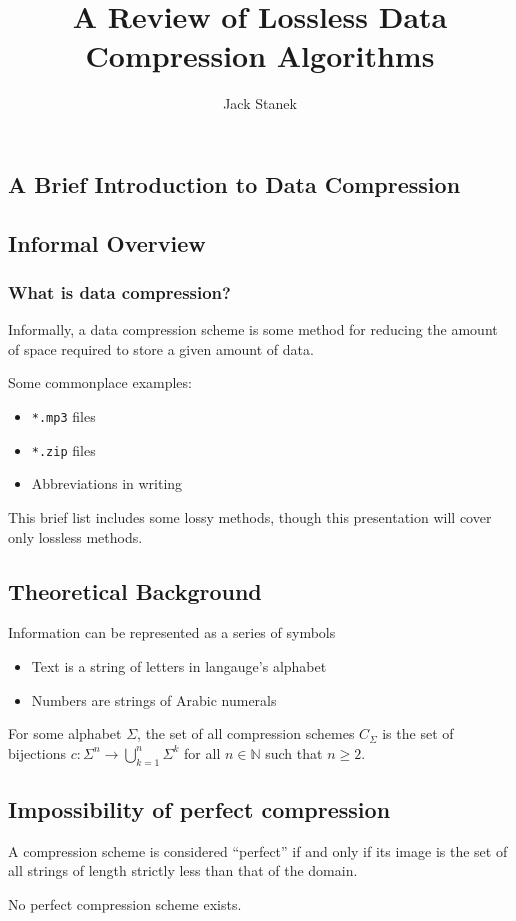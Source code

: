 \documentclass[mathserif,notheorems]{beamer} %
\title{A Review of Lossless Data Compression Algorithms}
\author{Jack Stanek}
\begin{document}
\begin{frame}
  \titlepage
\end{frame}

\begin{frame}
  \tableofcontents
\end{frame}

\begin{frame}
  \section{A Brief Introduction to Data Compression}
  \subsection{Informal Overview}
  \frametitle{What is data compression?}

  Informally, a data compression scheme is some method for reducing
  the amount of space required to store a given amount of data.

  Some commonplace examples:

  \begin{itemize}
  \item \texttt{*.mp3} files
  \item \texttt{*.zip} files
  \item Abbreviations in writing
  \end{itemize}

  This brief list includes some lossy methods, though this
  presentation will cover only lossless methods.
\end{frame}

\begin{frame}
  \subsection{Theoretical Background}
  Information can be represented as a series of symbols
  \begin{itemize}
  \item Text is a string of letters in langauge's alphabet
  \item Numbers are strings of Arabic numerals
  \end{itemize}
  For some alphabet $\Sigma$, the set of all compression schemes
  $C_\Sigma$ is the set of bijections
  $c : \Sigma^n \to \bigcup_{k = 1}^{n} \Sigma^k$ for all
  $n \in \mathbb{N}$ such that $n \geq 2$.
\end{frame}

\begin{frame}
  \subsection{Impossibility of perfect compression}
  A compression scheme is considered ``perfect'' if and only if its
  image is the set of all strings of length strictly less than that of
  the domain.
  \begin{Theorem}
    No perfect compression scheme exists.
  \end{Theorem}
\end{frame}
\end{document}
